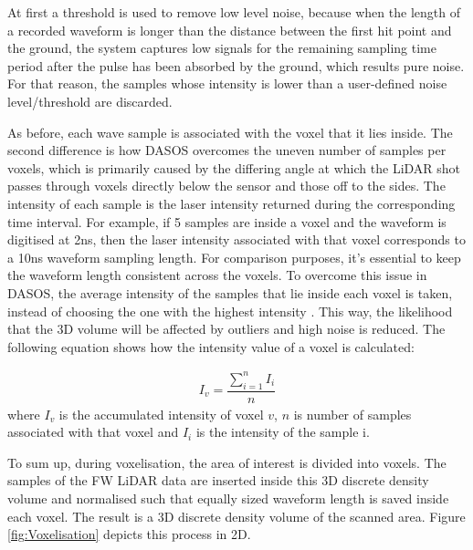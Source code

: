 \documentclass{subfiles}
\begin{document}
	\par At first a threshold is used to remove low level noise, because when the length of a recorded waveform is longer than the distance between the first hit point and the ground, the system captures low signals for the remaining sampling time period after the pulse has been absorbed by the ground, which results pure noise. For that reason, the samples whose intensity is lower than a user-defined noise level/threshold are discarded. 
		

		\par As before, each wave sample is associated with the voxel that it lies inside.  {\color{Fuchsia}The second difference is how DASOS overcomes the uneven number of samples per voxels, which is primarily caused by the differing angle at which the LiDAR shot passes through voxels directly below the sensor and those off to the sides. } The intensity of each sample is the laser intensity returned during the corresponding time interval. For example, if 5 samples are inside a voxel and the waveform is digitised at 2ns, then the laser intensity associated with that voxel corresponds to a 10ns waveform sampling length. For comparison purposes, it's essential to keep the waveform length consistent across the voxels. To overcome this issue in DASOS, the average intensity of the samples that lie inside each voxel is taken, instead of choosing the one with the highest intensity \cite{Persson2005}. This way, the likelihood that the 3D volume will be affected by outliers and high noise is reduced. The following equation shows how the intensity value of a voxel is calculated:
		
		\begin{eqnarray}
		I_{v} = \dfrac{\sum_{i=1}^{n}I_{i}}{n}
		\end{eqnarray} 
		where 		$I_{v}$ is the accumulated intensity of voxel $v$,
		$n$ is number of samples associated with that voxel and
		$I_{i}$ is the intensity of the sample i.
		
		To sum up, during voxelisation, the area of interest is divided into voxels. The samples of the FW LiDAR data are inserted inside this 3D discrete density volume and normalised such that equally sized waveform length is saved inside each voxel. The result is a 3D discrete density volume of the scanned area. Figure \ref{fig:Voxelisation} depicts this process in 2D.
		
\end{document}
